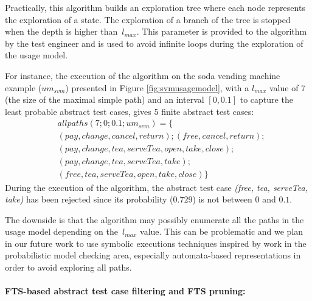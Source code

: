 Practically, this algorithm builds an exploration tree where each node represents the exploration of a state. The exploration of a branch of the tree is stopped when the depth is higher than~$l_{max}$. This parameter is provided to the algorithm by the test engineer and is used to avoid infinite loops during the exploration of the usage model. 

For instance, the execution of the algorithm on the soda vending machine example ($um_{svm}$) presented in Figure \ref{fig:svmusagemodel}, with a $l_{max}$ value of 7 (the size of the maximal simple path) and an interval $[0, 0.1]$ to capture the least probable abstract test cases, gives 5 finite abstract test cases: 
\begin{align*}
& allpaths  (7 ;  0 ; 0.1 ; um_{svm}) = \{ \\ 
    & (pay, change, cancel, return) ; (free, cancel, return) ;\\
    & (pay, change, tea, serveTea, open, take,  close); \\
    & (pay, change, tea, serveTea, take) ; \\
    & (free, tea, serveTea, open, take, close)
    \}
\end{align*}
During the execution of the algorithm, the abstract test case \textit{(free, tea, serve\-Tea, take)} has been rejected since its probability ($0.729$) is not between $0$ and $0.1$.

The downside is that the algorithm may possibly enumerate all the paths in the usage model depending on the~$l_{max}$ value. This can be problematic and we plan in our future work to use symbolic executions techniques inspired by work in the probabilistic model checking area, especially automata-based representations \cite{Classen2011} in order to avoid exploring all paths.


\paragraph{FTS-based abstract test case filtering and FTS pruning:}

